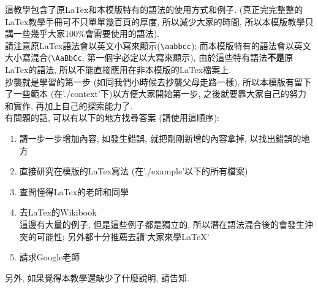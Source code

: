 

這教學包含了原LaTex和本模版特有的語法的使用方式和例子. (真正完完整整的LaTex教學手冊可不只單單幾百頁的厚度, 所以減少大家的時間, 所以本模版教學只講一些幾乎大家100\%會需要使用的語法).\\

請注意原LaTex語法會以英文小寫來顯示(\verb|\aabbcc|); 而本模版特有的語法會以英文大小寫混合(\verb|\AaBbCc|, 第一個字必定以大寫來顯示), 由於這些特有語法\textbf{不是}原LaTex的語法, 所以不能直接應用在非本模版的LaTex檔案上.\\

抄襲就是學習的第一步 (如同我們小時候去抄襲父母走路一樣), 所以本模版有留下了一些範本 (在'./context'下)以方便大家開始第一步, 之後就要靠大家自己的努力和實作, 再加上自己的探索能力了.\\

有問題的話, 可以有以下的地方找尋答案 (請使用這順序):
\begin{enumerate}
  \item 請一步一步增加內容, 如發生錯誤, 就把剛剛新增的內容拿掉, 以找出錯誤的地方
  \item 直接研究在模版的LaTex寫法 (在'./example'以下的所有檔案)
  \item 查問懂得LaTex的老師和同學
  \item 去LaTex的Wikibook\\
        這邊有大量的例子, 但是這些例子都是獨立的, 所以潛在語法混合後的會發生沖突的可能性; 另外都十分推薦去讀'大家來學LaTeX' 
  \item 請求Google老師
\end{enumerate}

另外, 如果覺得本教學還缺少了什麼說明, 請告知.


\newpage
\newpage
\newpage
\newpage
\newpage
\newpage
\newpage

\EndChapter

